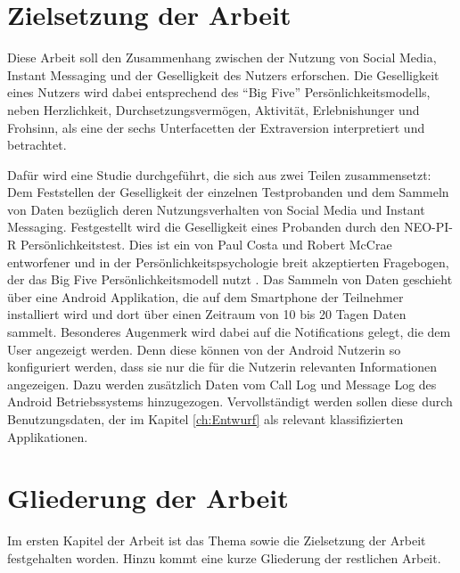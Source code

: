 \section{Zielsetzung der Arbeit}
\label{ch:Einleitung:sec:Zielsetzung}

Diese Arbeit soll den Zusammenhang zwischen der Nutzung von Social Media, Instant Messaging und der Geselligkeit des Nutzers erforschen.
Die Geselligkeit eines Nutzers wird dabei entsprechend des "`Big Five"' Persönlichkeitsmodells, neben Herzlichkeit, Durchsetzungsvermögen, Aktivität, Erlebnishunger und Frohsinn, als eine der sechs Unterfacetten der Extraversion interpretiert und betrachtet\cite{john1999big}.


Dafür wird eine Studie durchgeführt, die sich aus zwei Teilen zusammensetzt:
Dem Feststellen der Geselligkeit der einzelnen Testprobanden und dem Sammeln von Daten bezüglich deren Nutzungsverhalten von Social Media und Instant Messaging. 
Festgestellt wird die Geselligkeit eines Probanden durch den NEO-PI-R Persönlichkeitstest.
Dies ist ein von Paul Costa und Robert McCrae entworfener und in der Persönlichkeitspsychologie breit akzeptierten Fragebogen, der das Big Five Persönlichkeitsmodell nutzt \cite{costa1992neo}.
Das Sammeln von Daten geschieht über eine Android Applikation, die auf dem Smartphone der Teilnehmer installiert wird und dort über einen Zeitraum von 10 bis 20 Tagen Daten sammelt.
Besonderes Augenmerk wird dabei auf die Notifications gelegt, die dem User angezeigt werden.
Denn diese können von der Android Nutzerin so konfiguriert werden, dass sie nur die für die Nutzerin relevanten Informationen angezeigen.
Dazu werden zusätzlich Daten vom Call Log und Message Log des Android Betriebssystems hinzugezogen.
Vervollständigt werden sollen diese durch Benutzungsdaten, der im Kapitel \ref{ch:Entwurf} als relevant klassifizierten Applikationen.


\section{Gliederung der Arbeit}
\label{ch:Einleitung:sec:Gliederung}

Im ersten Kapitel der Arbeit ist das Thema sowie die Zielsetzung der Arbeit festgehalten worden.
Hinzu kommt eine kurze Gliederung der restlichen Arbeit.
\par

